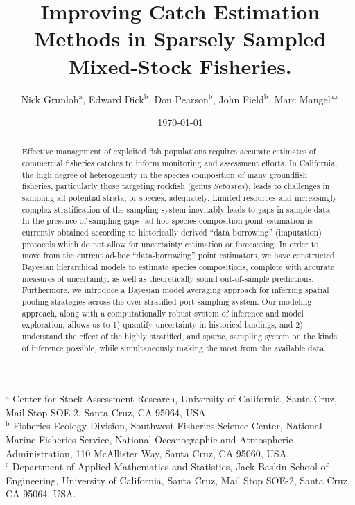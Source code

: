 \documentclass[12pt]{article}
\begin{document}
%
\title{Improving Catch Estimation Methods in Sparsely Sampled Mixed-Stock Fisheries.}
\author{Nick Grunloh$^\text{a}$, Edward Dick$^\text{b}$, Don Pearson$^\text{b}$, John Field$^\text{b}$, Marc Mangel$^\text{a,c}$}
\date{\today}
\maketitle
\noindent
$^\text{a}$ Center for Stock Assessment Research, University of California, Santa Cruz, Mail Stop SOE-2, Santa Cruz, CA 95064, USA.\\
$^\text{b}$ Fisheries Ecology Division, Southwest Fisheries Science Center, National Marine Fisheries Service, National Oceanographic and Atmospheric Administration, 110 McAllister Way, Santa Cruz, CA 95060, USA.\\
$^\text{c}$ Department of Applied Mathematics and Statistics, Jack Baskin School of Engineering, University of California, Santa Cruz, Mail Stop SOE-2, Santa Cruz, CA 95064, USA.

%
\begin{abstract}
Effective management of exploited fish populations requires accurate
estimates of commercial fisheries catches to inform monitoring and
assessment efforts. In California, the high degree of heterogeneity in
the species composition of many groundfish fisheries, particularly those
targeting rockfish (genus \(Sebastes\)), leads to challenges in sampling
all potential strata, or species, adequately. Limited resources and
increasingly complex stratification of the sampling system inevitably
leads to gaps in sample data. In the presence of sampling gaps, ad-hoc
species composition point estimation is currently obtained according to
historically derived ``data borrowing'' (imputation) protocols which do
not allow for uncertainty estimation or forecasting. In order to move
from the current ad-hoc ``data-borrowing'' point estimators, we have
constructed Bayesian hierarchical models to estimate species
compositions, complete with accurate measures of uncertainty, as well as
theoretically sound out-of-sample predictions. Furthermore, we introduce
a Bayesian model averaging approach for inferring spatial pooling
strategies across the over-stratified port sampling system. Our modeling
approach, along with a computationally robust system of inference and
model exploration, allows us to 1) quantify uncertainty in historical
landings, and 2) understand the effect of the highly stratified, and
sparse, sampling system on the kinds of inference possible, while
simultaneously making the most from the available data.
\end{abstract}
\end{document}
